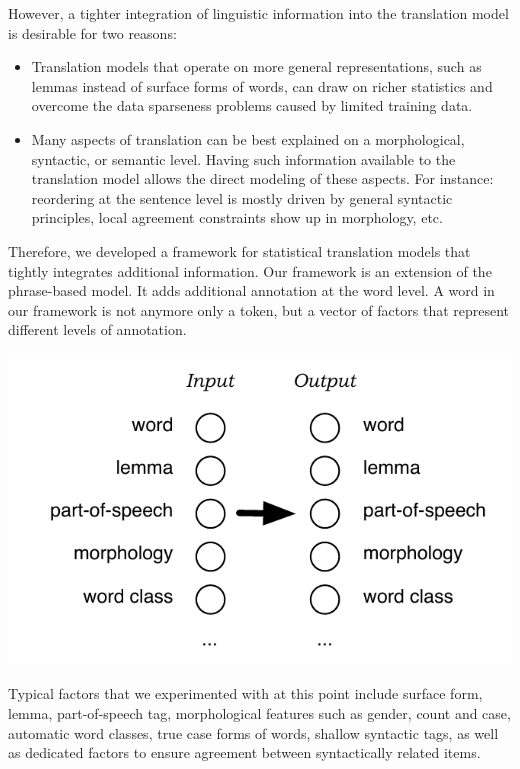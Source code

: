 \documentclass[11pt]{book}
\theoremstyle{plain}
\begin{document}
However, a tighter integration of linguistic information into the translation model is desirable for two reasons:
\begin{itemize}
\item Translation models that operate on more general representations, such as lemmas instead of surface forms of words, can draw on richer statistics and overcome the data sparseness problems caused by limited training data.
\item Many aspects of translation can be best explained on a morphological, syntactic, or semantic level. Having such information available to the translation model allows the direct modeling of these aspects. For instance: reordering at the sentence level is mostly driven by general syntactic principles, local agreement constraints show up in morphology, etc.
\end{itemize}

Therefore, we developed a framework for statistical translation models that tightly integrates additional information. Our framework is an extension of the phrase-based model. It adds additional annotation at the word level. A word in our framework is not anymore only a token, but a vector of factors that represent different levels of annotation.

\begin{center}
\includegraphics[scale=1]{factors.pdf}
\end{center}

Typical factors that we experimented with at this point include surface form, lemma, part-of-speech tag, morphological features such as gender, count and case, automatic word classes, true case forms of words, shallow syntactic tags, as well as dedicated factors to ensure agreement between syntactically related items. 
\end{document}
